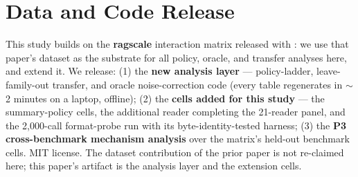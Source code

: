 \section{Data and Code Release}
\label{sec:release}

This study builds on the \textbf{ragscale} interaction matrix released with
\citet{panthi2026fixed}: we use that paper's dataset as the substrate for all
policy, oracle, and transfer analyses here, and extend it. We release: (1) the
\textbf{new analysis layer} --- policy-ladder, leave-family-out transfer, and
oracle noise-correction code (every table regenerates in $\sim$2 minutes on a
laptop, offline); (2) the \textbf{cells added for this study} --- the
summary-policy cells, the additional reader completing the 21-reader panel, and
the 2{,}000-call format-probe run with its byte-identity-tested harness; (3) the
\textbf{P3 cross-benchmark mechanism analysis} over the matrix's held-out
benchmark cells. MIT license. The dataset contribution of the prior paper is not
re-claimed here; this paper's artifact is the analysis layer and the extension
cells.
